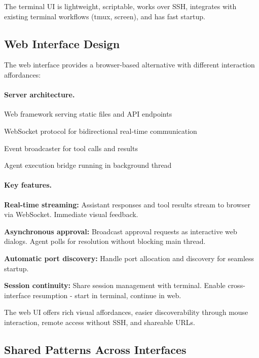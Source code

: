 The terminal UI is lightweight, scriptable, works over SSH, integrates with existing terminal workflows (tmux, screen), and has fast startup.

\subsection{Web Interface Design}
\label{sec:webui}

The web interface provides a browser-based alternative with different interaction affordances:

\paragraph{Server architecture.}
\begin{packeditemize}
\item Web framework serving static files and API endpoints
\item WebSocket protocol for bidirectional real-time communication
\item Event broadcaster for tool calls and results
\item Agent execution bridge running in background thread
\end{packeditemize}

\paragraph{Key features.}
\begin{packeditemize}
\item \textbf{Real-time streaming:} Assistant responses and tool results stream to browser via WebSocket. Immediate visual feedback.
\item \textbf{Asynchronous approval:} Broadcast approval requests as interactive web dialogs. Agent polls for resolution without blocking main thread.
\item \textbf{Automatic port discovery:} Handle port allocation and discovery for seamless startup.
\item \textbf{Session continuity:} Share session management with terminal. Enable cross-interface resumption - start in terminal, continue in web.
\end{packeditemize}

The web UI offers rich visual affordances, easier discoverability through mouse interaction, remote access without SSH, and shareable URLs.

\subsection{Shared Patterns Across Interfaces}
\label{sec:ui_components}


